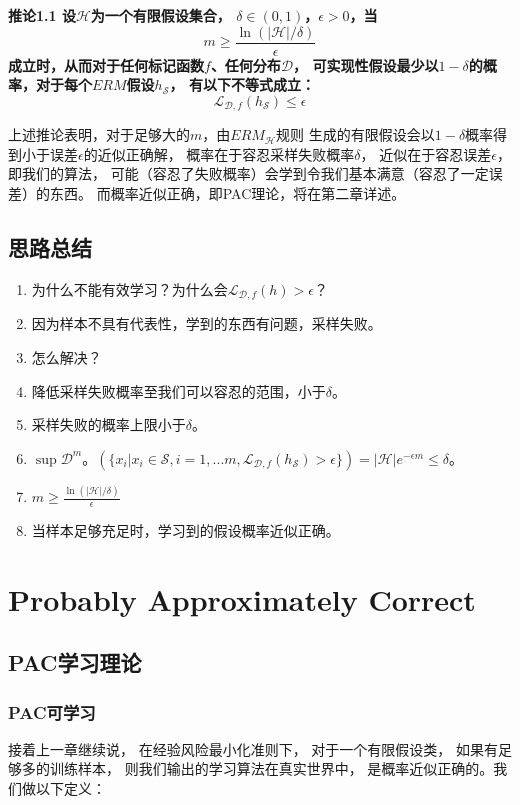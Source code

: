 \documentclass[UTF8]{ctexart}
\begin{document}
\textbf{
推论1.1 设$\mathcal{H}$为一个有限假设集合，
$\delta\in(0,1)$，$\epsilon>0$，当
$$
m \geq \frac{\ln(|\mathcal{H}|/\delta)}{\epsilon}
$$
成立时，从而对于任何标记函数$f$、任何分布$\mathcal{D}$，
可实现性假设最少以$1-\delta$的概率，对于每个$ERM$假设$h_{\mathcal{S}}$，
有以下不等式成立：
$$
\mathcal{L}_{\mathcal{D},f}(h_{\mathcal{S}})\leq\epsilon
$$
}

上述推论表明，对于足够大的$m$，由${ERM}_{\mathcal{H}}$规则
生成的有限假设会以$1-\delta$概率得到小于误差$\epsilon$的近似正确解，
概率在于容忍采样失败概率$\delta$，
近似在于容忍误差$\epsilon$，
即我们的算法，
可能（容忍了失败概率）会学到令我们基本满意（容忍了一定误差）的东西。
而概率近似正确，即PAC理论，将在第二章详述。

\subsection{思路总结}
\begin{enumerate}
\item 为什么不能有效学习？为什么会$\mathcal{L}_{\mathcal{D},f}(h)>\epsilon$？
\item 因为样本不具有代表性，学到的东西有问题，采样失败。
\item 怎么解决？
\item 降低采样失败概率至我们可以容忍的范围，小于$\delta$。
\item 采样失败的概率上限小于$\delta$。
\item $\sup{\mathcal{D}^m。
(\{x_i|x_i\in\mathcal{S},i=1,...m,
\mathcal{L}_{\mathcal{D},f}(h_{\mathcal{S}})>\epsilon
\})}=|\mathcal{H}|e^{-\epsilon m}\leq \delta$。
\item $m \geq \frac{\ln(|\mathcal{H}|/\delta)}{\epsilon}$
\item 当样本足够充足时，学习到的假设概率近似正确。
\end{enumerate}

\newpage


%
%
\section{Probably Approximately Correct}
\subsection{PAC学习理论}
\subsubsection{PAC可学习}
接着上一章继续说，
在经验风险最小化准则下，
对于一个有限假设类，
如果有足够多的训练样本，
则我们输出的学习算法在真实世界中，
是概率近似正确的。我们做以下定义：
\end{document}
